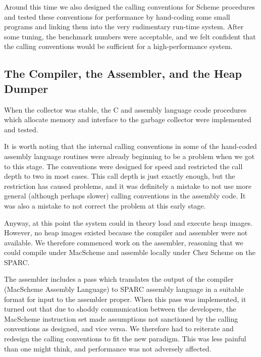 Around this time we also designed the calling conventions for Scheme
procedures and tested these conventions for performance by hand-coding some
small programs and linking them into the very rudimentary run-time system.
After some tuning, the benchmark numbers were acceptable, and we felt
confident that the calling conventions would be sufficient for a
high-performance system.

\subsection{The Compiler, the Assembler, and the Heap Dumper}

When the collector was stable, the C and assembly language ccode procedures
which allocate memory and interface to the garbage collector were
implemented and tested.

It is worth noting that the internal calling conventions in some of the
hand-coded assembly language routines were already beginning to be a problem
when we got to this stage. The conventions were designed for speed and
restricted the call depth to two in most cases. This call depth is just
exactly enough, but the restriction has caused problems, and it was
definitely a mistake to not use more general (although perhaps slower)
calling conventions in the assembly code.  It was also a mistake to not
correct the problem at this early stage.

Anyway, at this point the system could in theory load and execute heap
images.  However, no heap images existed because the compiler and assembler
were not available.  We therefore commenced work on the assembler, reasoning
that we could compile under MacScheme and assemble locally under Chez Scheme
on the SPARC.

The assembler includes a pass which translates the output of the compiler
(MacScheme Assembly Language) to SPARC assembly language in a suitable
format for input to the assembler proper. When this pass was implemented, it
turned out that due to shoddy communication between the developers, the
MacScheme instruction set made assumptions not sanctioned by the calling
conventions as designed, and vice versa. We therefore had to reiterate and
redesign the calling conventions to fit the new paradigm. This was less
painful than one might think, and performance was not adversely affected.

